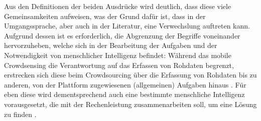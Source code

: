 Aus den Definitionen der beiden Ausdrücke wird deutlich, dass diese viele Gemeinsamkeiten aufweisen, was der Grund dafür ist, dass in der Umgangssprache, aber auch in der Literatur, eine Verwechslung auftreten kann. Aufgrund dessen ist es erforderlich, die Abgrenzung der Begriffe voneinander hervorzuheben, welche sich in der Bearbeitung der Aufgaben und der Notwendigkeit von menschlicher Intelligenz befindet: Während das mobile Crowdsensing die Verantwortung auf das Erfassen von Rohdaten begrenzt, erstrecken sich diese beim Crowdsourcing über die Erfassung von Rohdaten bis zu anderen, von der Plattform zugewiesenen (allgemeinen) Aufgaben hinaus \cite{Ray2022}. Für eben diese wird dementsprechend auch eine bestimmte menschliche Intelligenz vorausgesetzt, die mit der Rechenleistung zusammenarbeiten soll, um eine Lösung zu finden \cite{Ray2022}.

